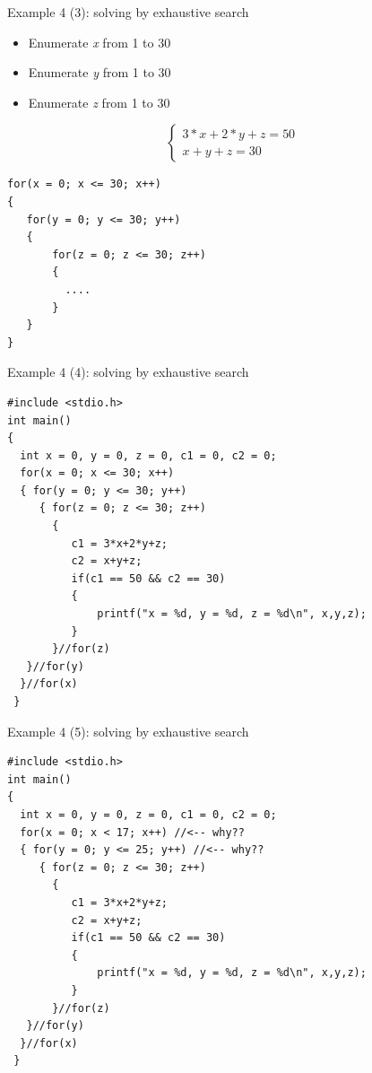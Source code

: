 \begin{frame}[fragile]{Example 4 (3): solving by exhaustive search}
\begin{itemize}
	\item {Enumerate \textit{x} from 1 to 30}
	\item {Enumerate \textit{y} from 1 to 30}
	\item {Enumerate \textit{z} from 1 to 30}
\end{itemize}
\begin{equation}
\left \{ \begin{array}{l}
  3*x+2*y+z=50 \\
  x+y+z=30
\end{array} \right.  \nonumber
\end{equation}
\begin{lstlisting}[numbers=none]
for(x = 0; x <= 30; x++)
{
   for(y = 0; y <= 30; y++)
   {
       for(z = 0; z <= 30; z++)
       {
         ....
       }
   }   
}
\end{lstlisting}
\end{frame}

\begin{frame}[fragile]{Example 4 (4): solving by exhaustive search}
\vspace{-0.15in}
\begin{lstlisting}[]
#include <stdio.h>
int main()
{
  int x = 0, y = 0, z = 0, c1 = 0, c2 = 0;
  for(x = 0; x <= 30; x++)
  { for(y = 0; y <= 30; y++)
     { for(z = 0; z <= 30; z++)
       {
          c1 = 3*x+2*y+z;
          c2 = x+y+z;
          if(c1 == 50 && c2 == 30)
          {
              printf("x = %d, y = %d, z = %d\n", x,y,z);
          }
       }//for(z)
   }//for(y)
  }//for(x)
 }
\end{lstlisting}
\end{frame}

\begin{frame}[fragile]{Example 4 (5): solving by exhaustive search}
\vspace{-0.15in}
\begin{lstlisting}[]
#include <stdio.h>
int main()
{
  int x = 0, y = 0, z = 0, c1 = 0, c2 = 0;
  for(x = 0; x < 17; x++) //<-- why??
  { for(y = 0; y <= 25; y++) //<-- why??
     { for(z = 0; z <= 30; z++)
       {
          c1 = 3*x+2*y+z;
          c2 = x+y+z;
          if(c1 == 50 && c2 == 30)
          {
              printf("x = %d, y = %d, z = %d\n", x,y,z);
          }
       }//for(z)
   }//for(y)
  }//for(x)
 }
\end{lstlisting}
\end{frame}



